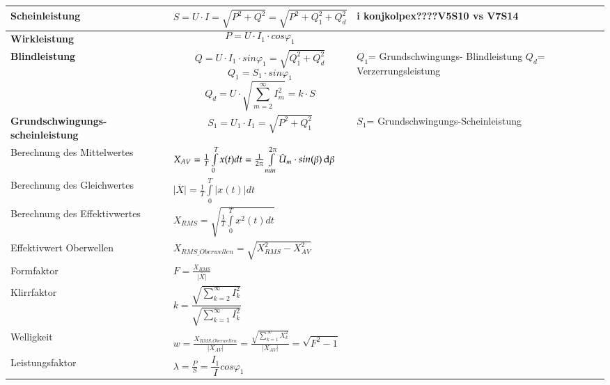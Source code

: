 \begin{longtable}{| p{} | p{} |p{}|}
    \hline
    
    \textbf{{\color{blue}Scheinleistung}}&
    \vspace{-0.5cm}\[ S=U\cdot I =  \sqrt{P^2+Q^2} = \sqrt{P^2+Q_1^2+Q_d^2} \]\vspace{-0.5cm}&\textbf{i konjkolpex????}\newline V5S10 vs V7S14
    \\ \hline
    
    \textbf{Wirkleistung}&
    \vspace{-0.5cm}\[ P=U\cdot I_1 \cdot cos\varphi_1 \]\vspace{-0.5cm}&
    \\ \hline 
       
    \textbf{\color{yellow}Blindleistung}&
    \vspace{-0.5cm}\[ Q=U\cdot I_1 \cdot sin\varphi_1 = \sqrt{Q_1^2+Q_d^2} \]
    \[ Q_1 = S_1 \cdot sin \varphi_1 \]
    \[ Q_d = U\cdot \sqrt{\sum_{m=2}^{\infty}I_m^2}  = k \cdot S \]\vspace{-0.2cm}&
    $ Q_1 $= Grundschwingungs- \newline \quad Blindleistung\newline
    $ Q_d $= Verzerrungsleistung\newline
    \\ \hline
      
    \textbf{\color{green}Grundschwingungs-\newline scheinleistung}&
    \vspace{-0.5cm}\[ S_1=U_1\cdot I_1 = \sqrt{P^2+Q_1^2}\]\vspace{-0.5cm}&
    $ S_1 $= Grundschwingungs-Scheinleistung
    \\ \hline    
    \hline
    Berechnung des Mittelwertes&
    $X_{AV} = \frac{1}{T}\int\limits_{0}^{T}x(t)dt = \frac{1}{2\pi}\int\limits_{min}^{2\pi}\hat{U}_m\cdot sin(\beta)\mathop{}\!\mathrm{d} \beta$
    &\\
    \hline
    Berechnung des Gleichwertes
    & $\overline{|X|} = \frac{1}{T} \int\limits_{0}^{T} |x(t)|dt$
    &\\
    \hline
    Berechnung des Effektivwertes
    & $X_{RMS} = \sqrt{\frac{1}{T}\int\limits_{0}^{T}x^2(t)dt}$
    &\\
    \hline
    Effektivwert Oberwellen
    & $X_{RMS\_Oberwellen} = \sqrt{X_{RMS}^2 - X_{AV}^2}$
    &\\
    \hline
    Formfaktor
    & $F = \frac{X_{RMS}}{\overline{|X|}}$
    &\\
    \hline
    Klirrfaktor
    &$ k= \dfrac{\sqrt{\sum_{k=2}^{\infty} I_k^2}}{\sqrt{\sum_{k=1}^{\infty} I_k^2}}$
    &\\
    \hline
    Welligkeit
    & $w = \frac{X_{RMS\_Oberwellen}}{|X_{AV}|}= \frac{\sqrt{\sum\limits_{k = 1}^{\infty}X_{k}^2}}{|X_{AV}|} = \sqrt{F^2-1}$
    &\\
    \hline
    Leistungsfaktor&
    $ \lambda = \frac{P}{S} = \dfrac{I_1}{I}cos\varphi_1 $
    &\\ \hline 
\end{longtable}
\clearpage

